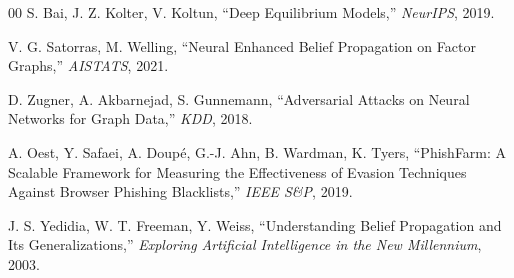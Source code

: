 \documentclass[conference]{IEEEtran}
\begin{document}
\begin{thebibliography}{00}
S. Bai, J. Z. Kolter, V. Koltun, ``Deep Equilibrium Models,''
\textit{NeurIPS}, 2019.

V. G. Satorras, M. Welling, ``Neural Enhanced Belief Propagation on Factor Graphs,''
\textit{AISTATS}, 2021.

D. Zugner, A. Akbarnejad, S. Gunnemann,
``Adversarial Attacks on Neural Networks for Graph Data,''
\textit{KDD}, 2018.

A. Oest, Y. Safaei, A. Doupé, G.-J. Ahn, B. Wardman, K. Tyers,
``PhishFarm: A Scalable Framework for Measuring the Effectiveness of Evasion
Techniques Against Browser Phishing Blacklists,''
\textit{IEEE S\&P}, 2019.

J. S. Yedidia, W. T. Freeman, Y. Weiss,
``Understanding Belief Propagation and Its Generalizations,''
\textit{Exploring Artificial Intelligence in the New Millennium}, 2003.

\end{thebibliography}
\end{document}
